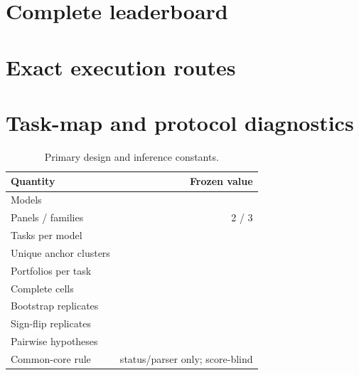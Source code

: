\documentclass{article}
\begin{document}
\clearpage
\appendix

\section{Complete leaderboard}
\label{app:leaderboard}

\begin{table}[h]
  \caption{Complete leaderboard on the common 534-task core. Rank intervals use the anchor-cluster
  bootstrap; groups summarize the Holm-controlled pairwise graph.}
  \centering
  \scriptsize
  \resizebox{\linewidth}{!}{}
\end{table}

\section{Exact execution routes}
\label{app:routes}

\begin{table}[h]
  \caption{Frozen execution routes. Automatic fallback is disabled; route changes represent
  complete model-block replacements, never cell pooling.}
  \centering
  \scriptsize
  \resizebox{\linewidth}{!}{}
\end{table}

\section{Task-map and protocol diagnostics}

\begin{table}[h]
  \caption{Frozen task-map diagnostics. Chance is the uniform mean over all 56 portfolios; top gap
  is the median best--second-best score difference.}
  \centering
  \small
  
\end{table}

\begin{table}[h]
  \caption{Primary design and inference constants.}
  \centering
  \small
  \begin{tabular}{@{}l r@{}}
    \toprule
    Quantity & Frozen value \\
    \midrule
    Models & \FBModels{} \\
    Panels / families & 2 / 3 \\
    Tasks per model & \FBTasks{} \\
    Unique anchor clusters & \FBUniqueAnchors{} \\
    Portfolios per task & \FBSelectionsPerTask{} \\
    Complete cells & \FBCompleteCells{} \\
    Bootstrap replicates & \FBBootstrapResamples{} \\
    Sign-flip replicates & \FBPermutationResamples{} \\
    Pairwise hypotheses & \FBPairs{} \\
    Common-core rule & status/parser only; score-blind \\
    \bottomrule
  \end{tabular}
\end{table}
\end{document}
